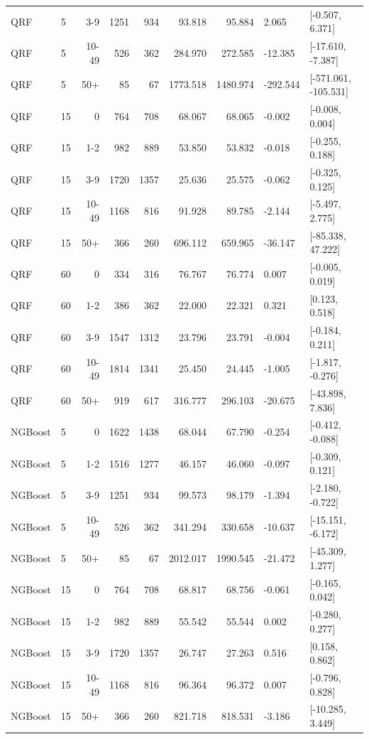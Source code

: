 \begin{longtable}{llrrrrrll}
QRF & 5 & 3-9 & 1251 & 934 & 93.818 & 95.884 & 2.065 & [-0.507, 6.371]\\
QRF & 5 & 10-49 & 526 & 362 & 284.970 & 272.585 & -12.385 & [-17.610, -7.387]\\
QRF & 5 & 50+ & 85 & 67 & 1773.518 & 1480.974 & -292.544 & [-571.061, -105.531]\\
QRF & 15 & 0 & 764 & 708 & 68.067 & 68.065 & -0.002 & [-0.008, 0.004]\\
QRF & 15 & 1-2 & 982 & 889 & 53.850 & 53.832 & -0.018 & [-0.255, 0.188]\\
QRF & 15 & 3-9 & 1720 & 1357 & 25.636 & 25.575 & -0.062 & [-0.325, 0.125]\\
QRF & 15 & 10-49 & 1168 & 816 & 91.928 & 89.785 & -2.144 & [-5.497, 2.775]\\
QRF & 15 & 50+ & 366 & 260 & 696.112 & 659.965 & -36.147 & [-85.338, 47.222]\\
QRF & 60 & 0 & 334 & 316 & 76.767 & 76.774 & 0.007 & [-0.005, 0.019]\\
QRF & 60 & 1-2 & 386 & 362 & 22.000 & 22.321 & 0.321 & [0.123, 0.518]\\
QRF & 60 & 3-9 & 1547 & 1312 & 23.796 & 23.791 & -0.004 & [-0.184, 0.211]\\
QRF & 60 & 10-49 & 1814 & 1341 & 25.450 & 24.445 & -1.005 & [-1.817, -0.276]\\
QRF & 60 & 50+ & 919 & 617 & 316.777 & 296.103 & -20.675 & [-43.898, 7.836]\\
NGBoost & 5 & 0 & 1622 & 1438 & 68.044 & 67.790 & -0.254 & [-0.412, -0.088]\\
NGBoost & 5 & 1-2 & 1516 & 1277 & 46.157 & 46.060 & -0.097 & [-0.309, 0.121]\\
NGBoost & 5 & 3-9 & 1251 & 934 & 99.573 & 98.179 & -1.394 & [-2.180, -0.722]\\
NGBoost & 5 & 10-49 & 526 & 362 & 341.294 & 330.658 & -10.637 & [-15.151, -6.172]\\
NGBoost & 5 & 50+ & 85 & 67 & 2012.017 & 1990.545 & -21.472 & [-45.309, 1.277]\\
NGBoost & 15 & 0 & 764 & 708 & 68.817 & 68.756 & -0.061 & [-0.165, 0.042]\\
NGBoost & 15 & 1-2 & 982 & 889 & 55.542 & 55.544 & 0.002 & [-0.280, 0.277]\\
NGBoost & 15 & 3-9 & 1720 & 1357 & 26.747 & 27.263 & 0.516 & [0.158, 0.862]\\
NGBoost & 15 & 10-49 & 1168 & 816 & 96.364 & 96.372 & 0.007 & [-0.796, 0.828]\\
NGBoost & 15 & 50+ & 366 & 260 & 821.718 & 818.531 & -3.186 & [-10.285, 3.449]\\

\end{longtable}
